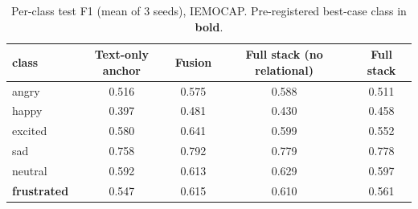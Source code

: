 \begin{table}[t]
\centering
\caption{Per-class test F1 (mean of 3 seeds), IEMOCAP. Pre-registered best-case class in \textbf{bold}.}
\label{tab:per-class-iemocap}
\begin{tabular}{lcccc}
\toprule
class & Text-only anchor & Fusion & Full stack (no relational) & Full stack \\
\midrule
angry & 0.516 & 0.575 & 0.588 & 0.511 \\
happy & 0.397 & 0.481 & 0.430 & 0.458 \\
excited & 0.580 & 0.641 & 0.599 & 0.552 \\
sad & 0.758 & 0.792 & 0.779 & 0.778 \\
neutral & 0.592 & 0.613 & 0.629 & 0.597 \\
\textbf{frustrated} & 0.547 & 0.615 & 0.610 & 0.561 \\
\bottomrule
\end{tabular}
\end{table}
